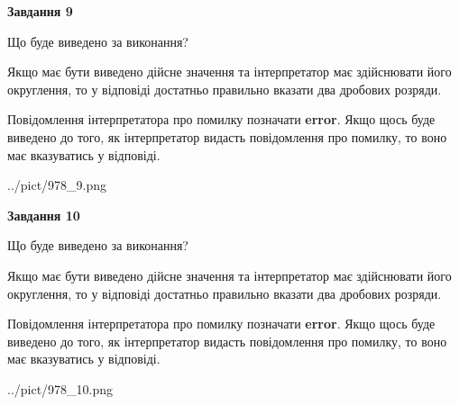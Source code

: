 \documentclass[12pt, ukrainian]{article}
\begin{document}
{\begin {Large}
{\begin {center}\textbf{Завдання 9}\end {center}}\par
Що буде виведено за виконання? \par

Якщо має бути виведено дійсне значення та інтерпретатор має здійснювати його округлення, 
то у відповіді достатньо правильно вказати два дробових розряди.

Повідомлення інтерпретатора про помилку позначати \textbf{error}.
Якщо щось буде виведено до того, як інтерпретатор видасть повідомлення про помилку, 
то воно має вказуватись у відповіді. \par

\begin{center}
	{../pict/978_9.png}
\end{center}
\newpage

{\begin {center}\textbf{Завдання 10}\end {center}}\par
Що буде виведено за виконання? \par

Якщо має бути виведено дійсне значення та інтерпретатор має здійснювати його округлення, 
то у відповіді достатньо правильно вказати два дробових розряди.

Повідомлення інтерпретатора про помилку позначати \textbf{error}.
Якщо щось буде виведено до того, як інтерпретатор видасть повідомлення про помилку, 
то воно має вказуватись у відповіді. \par

\begin{center}
	{../pict/978_10.png}
\end{center}
\newpage

\end {Large}}
\end{document}
